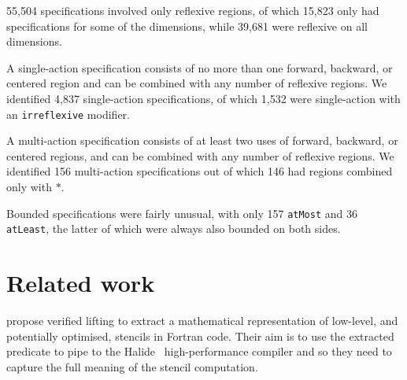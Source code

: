 \documentclass[10pt,preprint]{sigplanconf}
\theoremstyle{definition}
\newcommand{\term}[1]{\texttt{#1}}
\begin{document}
55,504 specifications involved only reflexive regions, of which 15,823
only had specifications for some of the dimensions, while 39,681 were
reflexive on all dimensions.




A single-action specification consists of no more than one forward,
backward, or centered region and can be combined with any number of
reflexive regions. We identified 4,837 single-action specifications,
of which 1,532 were single-action with an \texttt{irreflexive}
modifier.


A multi-action specification consists of at least two uses of forward,
backward, or centered regions, and can be combined with any number of
reflexive regions. We identified 156 multi-action specifications out
of which 146 had regions combined only with $\term{*}$.




Bounded specifications were fairly unusual, with only 157
\texttt{atMost} and 36 \texttt{atLeast}, the latter of which were
always also bounded on both sides.




\section{Related work}\label{sec:related-work}

\citet{kamil2016verified} propose verified lifting to extract a mathematical
representation of low-level, and potentially optimised, stencils in Fortran
code. Their aim is to use the extracted predicate to pipe to the \textsf{Halide}~\citep{ragan2013halide} high-performance
compiler and so they need to capture the full meaning of the stencil computation.
\end{document}
